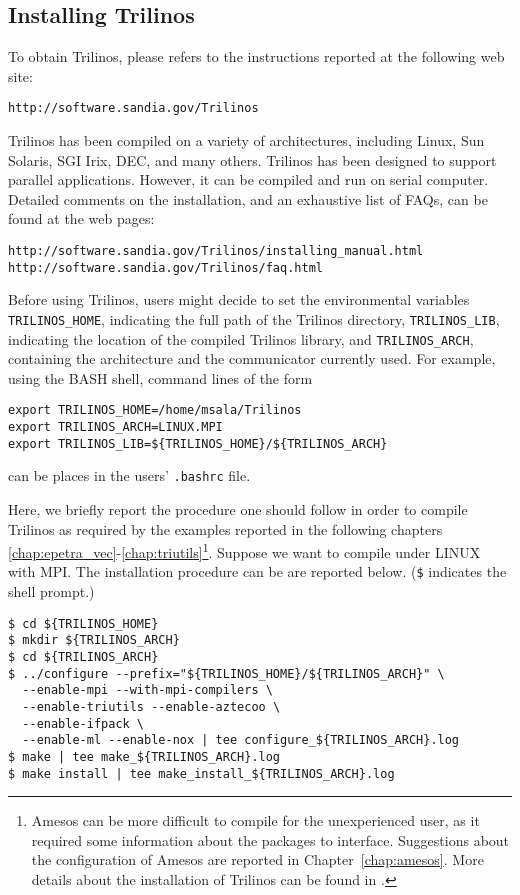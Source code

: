 
\subsection{Installing Trilinos}
\label{sec:installing}

To obtain Trilinos, please refers to the instructions reported at the
following web site:
\begin{verbatim}
http://software.sandia.gov/Trilinos
\end{verbatim}

Trilinos has been compiled on a variety of architectures, including
Linux, Sun Solaris, SGI Irix, DEC, and many others. Trilinos has been
designed to support parallel applications. However, it can be compiled
and run on serial computer.  Detailed comments on the installation, and
an exhaustive list of FAQs, can be found at the web pages:
\begin{verbatim}
http://software.sandia.gov/Trilinos/installing_manual.html
http://software.sandia.gov/Trilinos/faq.html
\end{verbatim}


Before using Trilinos, users might decide to set the environmental
variables \verb!TRILINOS_HOME!, indicating the full path of the Trilinos
directory, \verb!TRILINOS_LIB!, indicating the location of the compiled
Trilinos library, and \verb!TRILINOS_ARCH!, containing the architecture
and the communicator currently used.  For example, using the BASH shell,
command lines of the form
\begin{verbatim}
export TRILINOS_HOME=/home/msala/Trilinos
export TRILINOS_ARCH=LINUX.MPI
export TRILINOS_LIB=${TRILINOS_HOME}/${TRILINOS_ARCH}
\end{verbatim}
can be places in the users' \verb!.bashrc! file.

\smallskip

Here, we briefly report the procedure one should follow in order to
compile Trilinos as required by the examples reported in the following
chapters \ref{chap:epetra_vec}-\ref{chap:triutils}\footnote{Amesos can
  be more difficult to compile for the unexperienced user, as it
  required some information about the packages to interface. Suggestions
  about the configuration of Amesos are reported in
  Chapter~\ref{chap:amesos}. More details about the installation of
  Trilinos can be found in \cite{Trilinos-Users-Guide}.}.  Suppose we
want to compile under LINUX with MPI. The installation procedure can be
are reported below. (\verb!$! indicates the shell prompt.)
\begin{verbatim}
$ cd ${TRILINOS_HOME}
$ mkdir ${TRILINOS_ARCH}
$ cd ${TRILINOS_ARCH}
$ ../configure --prefix="${TRILINOS_HOME}/${TRILINOS_ARCH}" \
  --enable-mpi --with-mpi-compilers \
  --enable-triutils --enable-aztecoo \
  --enable-ifpack \
  --enable-ml --enable-nox | tee configure_${TRILINOS_ARCH}.log
$ make | tee make_${TRILINOS_ARCH}.log
$ make install | tee make_install_${TRILINOS_ARCH}.log
\end{verbatim}

